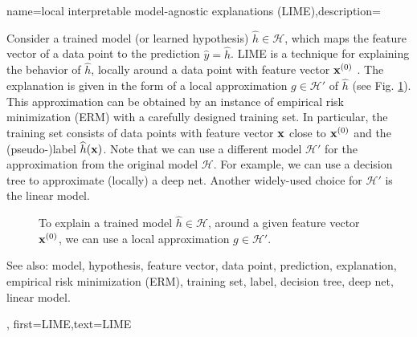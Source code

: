 {name={local interpretable model-agnostic explanations (LIME)},description={
		Consider 
		a trained model (or learned hypothesis) $\widehat{h} \in \mathcal{H}$, 
		which maps the feature vector of a data point to the prediction $\widehat{y}= \widehat{h}$. 
		LIME is a technique for explaining 
		the behavior of $\widehat{h}$, locally around a data point with feature vector ${\bf x}^{(0)}$ \cite{Ribeiro2016}. 
		The explanation is given in the form of a local approximation $g \in \mathcal{H}'$ of $\widehat{h}$ (see Fig. \ref{fig_lime}). 
		This approximation can be obtained by an instance of empirical risk minimization (ERM) with a carefully designed 
		training set. In particular, the training set consists of data points with 
		feature vector ${\bf x}$ close to ${\bf x}^{(0)}$ and the (pseudo-)label $\widehat{h}({\bf x})$. 
		Note that we can use a different model $\mathcal{H}'$ for the approximation from 
		the original model $\mathcal{H}$. For example, we can use a decision tree 
		to approximate (locally) a deep net. Another widely-used choice for $\mathcal{H}'$ is 
		the linear model. 
		\begin{figure}[H]
		\begin{center}
		\end{center}
		\caption{To explain a trained model $\widehat{h} \in \mathcal{H}$, around a 
		given feature vector ${\bf x}^{(0)}$, we can use a local approximation $g \in \mathcal{H}'$. }
		\label{fig_lime}
		\end{figure}
		See also: model, hypothesis, feature vector, data point, prediction, explanation, empirical risk minimization (ERM), training set, label, decision tree, deep net, linear model.},
	first={LIME},text={LIME}
}



